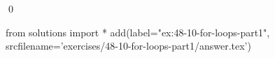 
\begin{ex}
  \label{ex:48-10-for-loops-part1}
  
  \qed
\end{ex}
\begin{python0}
from solutions import *
add(label="ex:48-10-for-loops-part1",
    srcfilename='exercises/48-10-for-loops-part1/answer.tex')
\end{python0}

